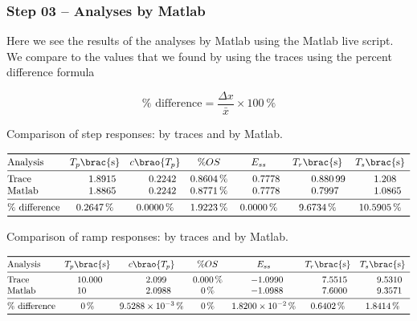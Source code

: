 \documentclass[12pt]{article}
\DeclarePairedDelimiter\brao()%
\DeclarePairedDelimiter\brac[]%
\begin{document}
\subsubsection{Step 03 -- Analyses by Matlab}

Here we see the results of the analyses by Matlab using the Matlab live script.
We compare to the values that we found by using the traces using the percent difference formula

\begin{equation}
	\text{$\si\percent$ difference} = \frac{\Delta x}{\bar{x}}\times\SI{100}\percent
\end{equation}



\begin{table}[h]
    \centering
    \caption{Comparison of step responses: by traces and by Matlab.}
	\[
		\begin{array}{@{}l*7S@{}}
		\toprule
			\text{Analysis} & T_p \brac{\si\second} & c\brao{T_p} & \si\percent OS & \text{$E_{ss}$} & T_r \brac{\si\second} & T_s \brac{\si\second}
		\\*
		\midrule
			\text{Trace} & 1.8915 & 0.2242 & \SI{0.8604}\percent & 0.7778 & 0.88099 & 1.208
		\\*
			\text{Matlab} & 1.8865 & 0.2242 & \SI{0.8771}\percent & 0.7778 & 0.7997 & 1.0865
		\\*
		\midrule
			\text{$\si\percent$ difference} & \SI{0.2647}\percent & \SI{0.0000}\percent & \SI{1.9223}\percent & \SI{0.0000}\percent & \SI{9.6734}\percent & \SI{10.5905}\percent
		\\*
		\bottomrule
		\end{array}
	\]
    \label{tab:comparison of step response analyses}
\end{table}



\begin{table}[h]
    \centering
    \caption{Comparison of ramp responses: by traces and by Matlab.}
	\[
		\begin{array}{@{}l*7S@{}}
		\toprule
			\text{Analysis} & T_p \brac{\si\second} & c\brao{T_p} & \si\percent OS & \text{$E_{ss}$} & T_r \brac{\si\second} & T_s \brac{\si\second}
		\\*
		\midrule
			\text{Trace} & 10.000 & 2.099 & \SI{0.000}\percent & -1.0990 & 7.5515 & 9.5310
		\\*
			\text{Matlab} & 10 & 2.0988 & \SI{0}\percent &  -1.0988 & 7.6000 & 9.3571
		\\*
		\midrule
			\text{$\si\percent$ difference} & \SI{0.}\percent & \SI{9.5288e-03}\percent & \SI{0.}\percent & \SI{1.8200e-02}\percent & \SI{0.6402}\percent & \SI{1.8414}\percent
		\\*
		\bottomrule
		\end{array}
	\]
    \label{tab:comparison of ramp response analyses}
\end{table}
\end{document}
